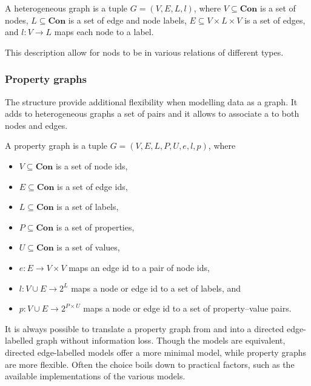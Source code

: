 \begin{definition}\label{def:heterogeneous-graph}
A heterogeneous graph is a tuple $G = (V, E, L, l)$, where $V \subseteq \textbf{Con}$ is a set of nodes, $L \subseteq \textbf{Con}$ is a set of edge and node labels, $E \subseteq V \times L \times V$ is a set of edges, and $l : V \to L$ maps each node to a label.
\end{definition}
This description allow for nods to be in various relations of different types.

\subsubsection{Property graphs}
The structure provide additional flexibility when modelling data as a graph. It adds to heterogeneous graphs a set of  pairs and it allows to associate a  to both nodes and edges.

\begin{definition}\label{def:property-graph}
A property graph is a tuple $G = (V, E, L, P, U, e, l, p)$, where
\begin{itemize}
    \item $V \subseteq \textbf{Con}$ is a set of node ids,
    \item $E \subseteq \textbf{Con}$ is a set of edge ids,
    \item $L \subseteq \textbf{Con}$ is a set of labels,
    \item $P \subseteq \textbf{Con}$ is a set of properties,
    \item $U \subseteq \textbf{Con}$ is a set of values,
    \item $e : E \to V \times V$ maps an edge id to a pair of node ids,
    \item $l : V \cup E \to 2^L$ maps a node or edge id to a set of labels, and
    \item $p : V \cup E \to 2^{P \times U}$ maps a node or edge id to a set of property–value pairs.
\end{itemize}
\end{definition}

It is always possible to translate a property graph from and into a directed edge-labelled graph without information loss. Though the models are equivalent, directed edge-labelled models offer a more minimal model, while property graphs are more flexible. Often the choice boils down to practical factors, such as the available implementations of the various models.

